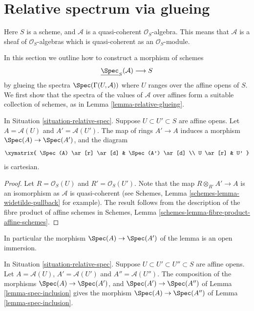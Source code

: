 \section{Relative spectrum via glueing}
\label{section-spec-via-glueing}

\begin{situation}
\label{situation-relative-spec}
Here $S$ is a scheme, and $\mathcal{A}$ is a quasi-coherent
$\mathcal{O}_S$-algebra. This means that $\mathcal{A}$ is a
sheaf of $\mathcal{O}_S$-algebras which is quasi-coherent as an
$\mathcal{O}_S$-module.
\end{situation}

\noindent
In this section we outline how to construct a morphism
of schemes
$$
\underline{\Spec}_S(\mathcal{A}) \longrightarrow S
$$
by glueing the spectra $\Spec(\Gamma(U, \mathcal{A}))$
where $U$ ranges over the affine opens of $S$. We first show that the
spectra of the values of $\mathcal{A}$ over affines form a
suitable collection of schemes, as in Lemma \ref{lemma-relative-glueing}.

\begin{lemma}
\label{lemma-spec-inclusion}
In Situation \ref{situation-relative-spec}.
Suppose $U \subset U' \subset S$ are affine opens.
Let $A = \mathcal{A}(U)$ and $A' = \mathcal{A}(U')$.
The map of rings $A' \to A$ induces a morphism
$\Spec(A) \to \Spec(A')$, and the diagram
$$
\xymatrix{
\Spec(A) \ar[r] \ar[d] &
\Spec(A') \ar[d] \\
U \ar[r] &
U'
}
$$
is cartesian.
\end{lemma}

\begin{proof}
Let $R = \mathcal{O}_S(U)$ and $R' = \mathcal{O}_S(U')$.
Note that the map $R \otimes_{R'} A' \to A$ is an isomorphism as
$\mathcal{A}$ is quasi-coherent
(see Schemes, Lemma \ref{schemes-lemma-widetilde-pullback} for example).
The result follows from the description of the fibre product of
affine schemes in
Schemes, Lemma \ref{schemes-lemma-fibre-product-affine-schemes}.
\end{proof}

\noindent
In particular the morphism $\Spec(A) \to \Spec(A')$
of the lemma is an open immersion.

\begin{lemma}
\label{lemma-transitive-spec}
In Situation \ref{situation-relative-spec}.
Suppose $U \subset U' \subset U'' \subset S$ are affine opens.
Let $A = \mathcal{A}(U)$, $A' = \mathcal{A}(U')$ and $A'' = \mathcal{A}(U'')$.
The composition of the morphisms
$\Spec(A) \to \Spec(A')$, and
$\Spec(A') \to \Spec(A'')$ of
Lemma \ref{lemma-spec-inclusion} gives the
morphism $\Spec(A) \to \Spec(A'')$
of Lemma \ref{lemma-spec-inclusion}.
\end{lemma}

